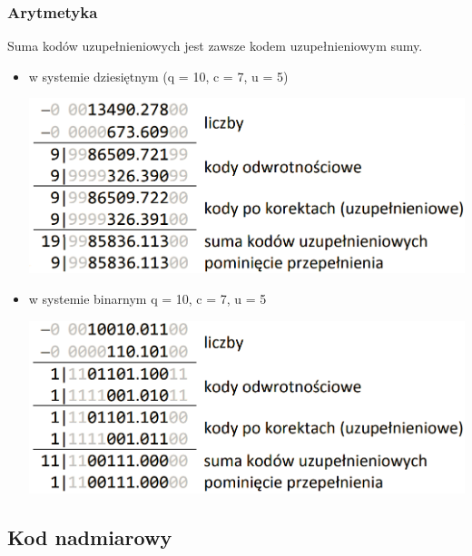 \documentclass[12pt]{article}
\begin{document}
    \subsubsection{Arytmetyka}
    Suma kodów uzupełnieniowych jest zawsze kodem uzupełnieniowym sumy.
    \begin{itemize}
        \item w systemie dziesiętnym  (q = 10, c = 7, u = 5)
        \begin{center}
            \includegraphics[scale=0.4]{graphics/number-repr/uzp-add-dec.png}
        \end{center}

        \item w systemie binarnym q = 10, c = 7, u = 5
        \begin{center}
            \includegraphics[scale=0.4]{graphics/number-repr/uzp-add-bin.png}
        \end{center}
    \end{itemize}

    \subsection{Kod nadmiarowy}
\end{document}
